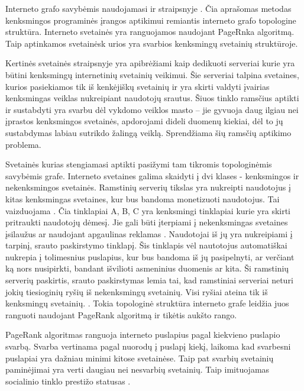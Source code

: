Interneto grafo savybėmis naudojamasi ir straipsnyje . Čia aprašomas metodas kenksmingos programinės įrangos aptikimui remiantis interneto grafo topologine struktūra. Interneto svetainės yra ranguojamos naudojant PageRnka algoritmą. Taip aptinkamos svetainėsk urios yra svarbios kenksmingų svetainių struktūroje.

Kertinės svetainės straipsnyje \cite{linchpins} yra apibrėžiami kaip dedikuoti serveriai kurie yra būtini kenksmingų internetinių svetainių veikimui. Šie serveriai talpina svetaines, kurios pasiekiamos tik iš kenkėjiškų svetainių ir yra skirti valdyti įvairias kenksmingas veiklas nukreipiant naudotojų srautus. Šiuos tinklo ramsčius aptikti ir sustabdyti yra svarbu dėl vykdomo veiklos masto -- jie gyvuoja daug ilgiau nei įprastos kenksmingos svetainės, apdorojami dideli duomenų kiekiai, dėl to jų sustabdymas labiau sutrikdo žalingą veiklą. Sprendžiama šių ramsčių aptikimo problema.

Svetainės kurias stengiamasi aptikti pasižymi tam tikromis topologinėmis savybėmis grafe. Interneto svetaines galima skaidyti į dvi klases - kenksmingos ir nekenksmingos svetainės. Ramstinių serverių tikslas yra nukreipti naudotojus į kitas kenksmingas svetaines, kur bus bandoma monetizuoti naudotojus. Tai vaizduojama . Čia tinklapiai A, B, C yra kenksmingi tinklapiai kurie yra skirti pritraukti naudotojų dėmesį. Jie gali būti įterpiami į nekenksmingas svetaines įsilaužus ar naudojant apgaulinas reklamas \cite{tax}. Naudotojai iš jų yra nukreipiami į tarpinį, srauto paskirstymo tinklapį. Šis tinklapis vėl nautotojus automatiškai nukrepia į tolimesnius puslapius, kur bus bandoma iš jų pasipelnyti, ar verčiant ką nors nusipirkti, bandant išvilioti asmeninius duomenis ar kita. Ši ramstinių serverių paskirtis, srauto paskirstymas lemia tai, kad ramstiniai serveriai neturi jokių tiesioginių ryšių iš nekenksmingų svetainių. Visi ryšiai ateina tik iš kenksmingų svetainių. \cite{linchpins}. Tokia topologinė struktūra interneto grafe leidžia juos ranguoti naudojant PageRank algoritmą ir tikėtis aukšto rango.


PageRank algoritmas ranguoja interneto puslapius pagal kiekvieno puslapio svarbą. Svarba vertinama pagal nuorodų į puslapį kiekį, laikoma kad svarbesni puslapiai yra dažniau minimi kitose svetainėse. Taip pat svarbių svetainių paminėjimai yra verti daugiau nei nesvarbių svetainių. Taip imituojamas socialinio tinklo prestižo statusas \cite{Wu2008}.

